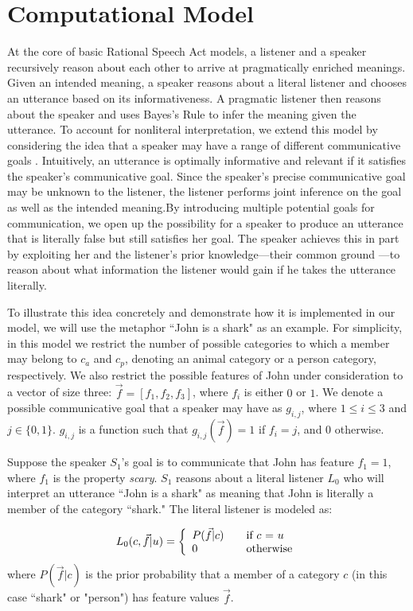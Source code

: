 \documentclass[10pt,letterpaper]{article}
\begin{document}
\section{Computational Model}
At the core of basic Rational Speech Act models, a listener and a speaker recursively reason about each other to arrive at pragmatically enriched meanings. Given an intended meaning, a speaker reasons about a literal listener and chooses an utterance based on its informativeness. A pragmatic listener then reasons about the speaker and uses Bayes's Rule to infer the meaning given the utterance. To account for nonliteral interpretation, we extend this model by considering the idea that a speaker may have a range of different communicative goals \cite{}. Intuitively, an utterance is optimally informative and relevant if it satisfies the speaker's communicative goal. Since the speaker's precise communicative goal may be unknown to the listener, the listener performs joint inference on the goal as well as the intended meaning.By introducing multiple potential goals for communication, we open up the possibility for a speaker to produce an utterance that is literally false but still satisfies her goal. The speaker achieves this in part by exploiting her and the listener's prior knowledge---their common ground \cite{clark1996using}---to reason about what information the listener would gain if he takes the utterance literally. 

To illustrate this idea concretely and demonstrate how it is implemented in our model, we will use the metaphor ``John is a shark" as an example. For simplicity, in this model we restrict the number of possible categories to which a member may belong to $c_a$ and $c_p$, denoting an animal category or a person category, respectively. We also restrict the possible features of John under consideration to a vector of size three: $\vec f = [f_1, f_2, f_3]$, where $f_i$ is either $0$ or $1$. We denote a possible communicative goal that a speaker may have as $g_{i,j}$, where $1 \leq i \leq 3$ and $j \in \{0,1\}$. $g_{i,j}$ is a function such that $g_{i,j} (\vec f) = 1$ if $f_i = j$, and $0$ otherwise. 

Suppose the speaker $S_1$'s goal is to communicate that John has feature $f_1 =1$, where $f_1$ is the property \emph{scary}. $S_1$ reasons about a literal listener $L_0$ who will interpret an utterance ``John is a shark" as meaning that John is literally a member of the category ``shark." The literal listener is modeled as:

\[ L_0(c, \vec f |u) = \left\{ 
  \begin{array}{l l}
    P(\vec f | c) & \quad \text{if $c$ = $u$}\\
    0 & \quad \text{otherwise}
  \end{array} \right.\]
where $P(\vec f | c)$ is the prior probability that a member of a category $c$ (in this case ``shark" or "person") has feature values $\vec f$.
\end{document}

